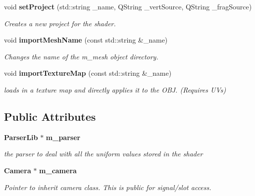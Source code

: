 \begin{DoxyCompactItemize}
void {\bf set\-Project} (std\-::string \-\_\-name, Q\-String \-\_\-vert\-Source, Q\-String \-\_\-frag\-Source)
\begin{DoxyCompactList}\small\item\em Creates a new project for the shader. \end{DoxyCompactList}\item 
void {\bf import\-Mesh\-Name} (const std\-::string \&\-\_\-name)
\begin{DoxyCompactList}\small\item\em Changes the name of the m\-\_\-mesh object directory. \end{DoxyCompactList}\item 
void {\bf import\-Texture\-Map} (const std\-::string \&\-\_\-name)
\begin{DoxyCompactList}\small\item\em loads in a texture map and directly applies it to the O\-B\-J. (Requires U\-Vs) \end{DoxyCompactList}\end{DoxyCompactItemize}
\subsection*{Public Attributes}
\begin{DoxyCompactItemize}
\item 
{\bf Parser\-Lib} $\ast$ {\bf m\-\_\-parser}
\begin{DoxyCompactList}\small\item\em the parser to deal with all the uniform values stored in the shader \end{DoxyCompactList}\item 
{\bf Camera} $\ast$ {\bf m\-\_\-camera}
\begin{DoxyCompactList}\small\item\em Pointer to inherit camera class. This is public for signal/slot access. \end{DoxyCompactList}\end{DoxyCompactItemize}

